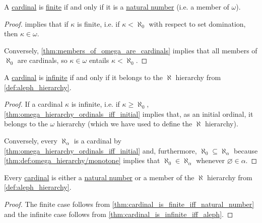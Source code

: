 \begin{proposition}\label{thm:cardinal_is_finite_iff_natural_number}
  A \hyperref[def:cardinal]{cardinal} is \hyperref[def:aleph_zero_related_cardinalities]{finite} if and only if it is a \hyperref[def:natural_numbers]{natural number} (i.e. a member of \( \omega \)).
\end{proposition}
\begin{proof}
   implies that if \( \kappa \) is finite, i.e. if \( \kappa < \aleph_0 \) with respect to set domination, then \( \kappa \in \omega \).

  Conversely, \cref{thm:members_of_omega_are_cardinals} implies that all members of \( \aleph_0 \) are cardinals, so \( \kappa \in \omega \) entails \( \kappa < \aleph_0 \).
\end{proof}

\begin{proposition}\label{thm:cardinal_is_infinite_iff_aleph}
  A \hyperref[def:cardinal]{cardinal} is \hyperref[def:aleph_zero_related_cardinalities]{infinite} if and only if it belongs to the \( \aleph \) hierarchy from \cref{def:aleph_hierarchy}.
\end{proposition}
\begin{proof}
  If a cardinal \( \kappa \) is infinite, i.e. if \( \kappa \geq \aleph_0 \), \cref{thm:omega_hierarchy_ordinals_iff_initial} implies that, as an initial ordinal, it belongs to the \( \omega \) hierarchy (which we have used to define the \( \aleph \) hierarchy).

  Conversely, every \( \aleph_\alpha \) is a cardinal by \cref{thm:omega_hierarchy_ordinals_iff_initial} and, furthermore, \( \aleph_0 \subseteq \aleph_\alpha \) because \cref{thm:def:omega_hierarchy/monotone} implies that \( \aleph_0 \in \aleph_\alpha \) whenever \( \varnothing \in \alpha \).
\end{proof}

\begin{corollary}\label{thm:cardinal_iff_finite_or_aleph}
  Every \hyperref[def:cardinal]{cardinal} is either a \hyperref[def:natural_numbers]{natural number} or a member of the \( \aleph \) hierarchy from \cref{def:aleph_hierarchy}.
\end{corollary}
\begin{proof}
  The finite case follows from \cref{thm:cardinal_is_finite_iff_natural_number} and the infinite case follows from \cref{thm:cardinal_is_infinite_iff_aleph}.
\end{proof}

